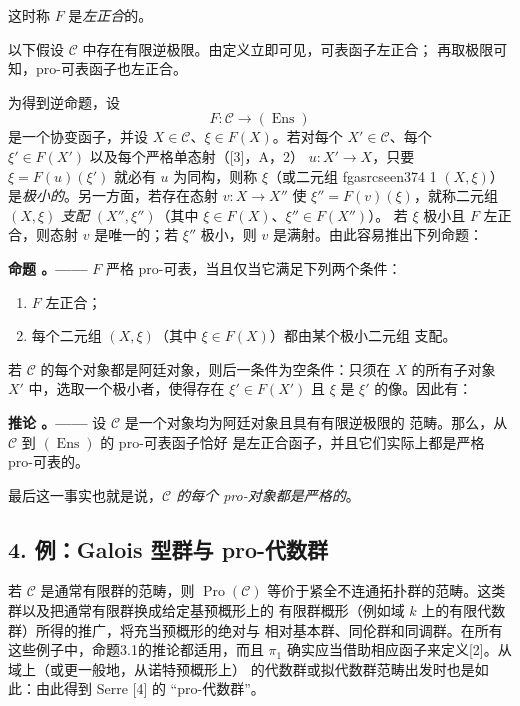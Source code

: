 \documentclass[12pt,twoside,openany]{book}
\numberwithin{equation}{section}
\newcommand{\fgaunitid}{unbound}
\newcommand{\src}[1]{%
  \phantomsection
  \hypertarget{src:\fgaunitid:#1}{}%
  \hypertarget{fga.\fgaunitid.p#1}{}%
  \ifcsname fgasrcseen#1\endcsname\else
    \expandafter\gdef\csname fgasrcseen#1\endcsname{1}%
    \hypertarget{src:#1}{}%
  \fi
  \marginpar{\raggedleft\footnotesize\sffamily #1}%
}
\newcommand{\fquote}[1]{“#1”}
\theoremstyle{plain}
\theoremstyle{definition}
\theoremstyle{remark}
\newcommand{\result}[2]{%
  \par\medskip\noindent\textbf{#1%
  \if\relax\detokenize{#2}\relax\else\space#2\fi。——}\enspace
}
\begin{document}
这时称 $F$ 是\emph{左正合}的。

以下假设 $\mathcal C$ 中存在有限逆极限。由定义立即可见，可表函子左正合；
再取极限可知，pro-可表函子也左正合。

为得到逆命题，设
\[
  F:\mathcal C\longrightarrow(\operatorname{Ens})
\]
是一个协变函子，并设 $X\in\mathcal C$、$\xi\in F(X)$。若对每个
$X'\in\mathcal C$、每个 $\xi'\in F(X')$ 以及每个严格单态射（[3]，A，2）
$u:X'\longrightarrow X$，只要 $\xi=F(u)(\xi')$ 就必有 $u$ 为同构，则称
$\xi$（或二元组 \src{374}$(X,\xi)$）是\emph{极小的}。另一方面，若存在态射
$v:X\longrightarrow X''$ 使 $\xi''=F(v)(\xi)$，就称二元组 $(X,\xi)$
\emph{支配} $(X'',\xi'')$（其中 $\xi\in F(X)$、$\xi''\in F(X'')$）。
若 $\xi$ 极小且 $F$ 左正合，则态射 $v$ 是唯一的；若 $\xi''$ 极小，则
$v$ 是满射。由此容易推出下列命题：

\result{命题}{3.1} $F$ 严格 pro-可表，当且仅当它满足下列两个条件：
\begin{enumerate}
\item[(i)] $F$ 左正合；
\item[(ii)] 每个二元组 $(X,\xi)$（其中 $\xi\in F(X)$）都由某个极小二元组
支配。
\end{enumerate}

若 $\mathcal C$ 的每个对象都是阿廷对象，则后一条件为空条件：只须在 $X$
的所有子对象 $X'$ 中，选取一个极小者，使得存在 $\xi'\in F(X')$ 且
$\xi$ 是 $\xi'$ 的像。因此有：

\result{推论}{} 设 $\mathcal C$ 是一个对象均为阿廷对象且具有有限逆极限的
范畴。那么，从 $\mathcal C$ 到 $(\operatorname{Ens})$ 的 pro-可表函子恰好
是左正合函子，并且它们实际上都是严格 pro-可表的。

最后这一事实也就是说，\emph{$\mathcal C$ 的每个 pro-对象都是严格的}。

\subsection*{4. 例：Galois 型群与 pro-代数群}

若 $\mathcal C$ 是通常有限群的范畴，则 $\operatorname{Pro}(\mathcal C)$
等价于紧全不连通拓扑群的范畴。这类群以及把通常有限群换成给定基预概形上的
有限群概形（例如域 $k$ 上的有限代数群）所得的推广，将充当预概形的绝对与
相对基本群、同伦群和同调群。在所有这些例子中，命题3.1的推论都适用，而且
$\pi_1$ 确实应当借助相应函子来定义[2]。从域上（或更一般地，从诺特预概形上）
的代数群或拟代数群范畴出发时也是如此：由此得到 Serre [4] 的
\fquote{pro-代数群}。
\end{document}
